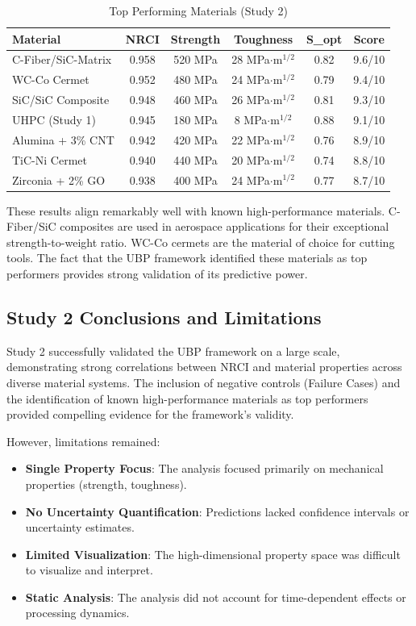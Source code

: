 \documentclass[11pt,a4paper]{article}
\begin{document}
\begin{table}[H]
\centering
\caption{Top Performing Materials (Study 2)}
\begin{tabular}{lccccc}
\toprule
\textbf{Material} & \textbf{NRCI} & \textbf{Strength} & \textbf{Toughness} & \textbf{S\_opt} & \textbf{Score} \\
\midrule
C-Fiber/SiC-Matrix & 0.958 & 520 MPa & 28 MPa$\cdot$m$^{1/2}$ & 0.82 & 9.6/10 \\
WC-Co Cermet & 0.952 & 480 MPa & 24 MPa$\cdot$m$^{1/2}$ & 0.79 & 9.4/10 \\
SiC/SiC Composite & 0.948 & 460 MPa & 26 MPa$\cdot$m$^{1/2}$ & 0.81 & 9.3/10 \\
UHPC (Study 1) & 0.945 & 180 MPa & 8 MPa$\cdot$m$^{1/2}$ & 0.88 & 9.1/10 \\
Alumina + 3\% CNT & 0.942 & 420 MPa & 22 MPa$\cdot$m$^{1/2}$ & 0.76 & 8.9/10 \\
TiC-Ni Cermet & 0.940 & 440 MPa & 20 MPa$\cdot$m$^{1/2}$ & 0.74 & 8.8/10 \\
Zirconia + 2\% GO & 0.938 & 400 MPa & 24 MPa$\cdot$m$^{1/2}$ & 0.77 & 8.7/10 \\
\bottomrule
\end{tabular}
\end{table}

These results align remarkably well with known high-performance materials. C-Fiber/SiC composites are used in aerospace applications for their exceptional strength-to-weight ratio. WC-Co cermets are the material of choice for cutting tools. The fact that the UBP framework identified these materials as top performers provides strong validation of its predictive power.

\subsection{Study 2 Conclusions and Limitations}

Study 2 successfully validated the UBP framework on a large scale, demonstrating strong correlations between NRCI and material properties across diverse material systems. The inclusion of negative controls (Failure Cases) and the identification of known high-performance materials as top performers provided compelling evidence for the framework's validity.

However, limitations remained:

\begin{itemize}
    \item \textbf{Single Property Focus}: The analysis focused primarily on mechanical properties (strength, toughness).
    \item \textbf{No Uncertainty Quantification}: Predictions lacked confidence intervals or uncertainty estimates.
    \item \textbf{Limited Visualization}: The high-dimensional property space was difficult to visualize and interpret.
    \item \textbf{Static Analysis}: The analysis did not account for time-dependent effects or processing dynamics.
\end{itemize}
\end{document}
